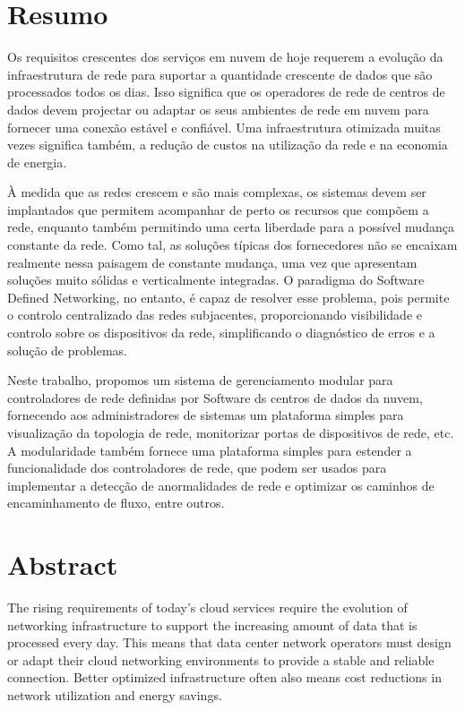 \chapter*{Resumo}
Os requisitos crescentes dos serviços em nuvem de hoje requerem a evolução da infraestrutura de rede para suportar a quantidade crescente de dados que são
processados todos os dias. Isso significa que os operadores de rede de centros de dados devem projectar ou adaptar os seus ambientes de rede em nuvem para fornecer
uma conexão estável e confiável.  Uma infraestrutura otimizada muitas vezes significa também, a redução de custos na utilização da rede e na economia de energia.

\par À medida que as redes crescem e são mais complexas, os sistemas devem ser implantados que permitem acompanhar de perto os recursos que compõem a rede, 
enquanto também permitindo uma certa liberdade para a possível mudança constante da rede. Como tal, as soluções típicas dos fornecedores não se encaixam realmente
nessa paisagem de constante mudança, uma vez que apresentam soluções muito sólidas e verticalmente integradas. O paradigma do Software Defined Networking, no entanto,
é capaz de resolver esse problema, pois permite o controlo centralizado das redes subjacentes, proporcionando visibilidade e controlo sobre os dispositivos da
rede, simplificando o diagnóstico de erros e a solução de problemas.

\par Neste trabalho, propomos um sistema de gerenciamento modular para controladores de rede definidas por Software ds centros de dados da nuvem, fornecendo aos
administradores de sistemas um plataforma simples para visualização da topologia de rede, monitorizar portas de dispositivos de rede, etc. A modularidade também 
fornece uma plataforma simples para estender a funcionalidade dos controladores de rede, que podem ser usados para implementar a detecção de anormalidades de rede e
optimizar os caminhos de encaminhamento de fluxo, entre outros.

\chapter*{Abstract}

The rising requirements of today's cloud services require the evolution of networking infrastructure to support the increasing amount of data that is processed
every day. This means that data center network operators must design or adapt their cloud networking environments to provide a stable and reliable connection.
Better optimized infrastructure often also means cost reductions in network utilization and energy savings.

